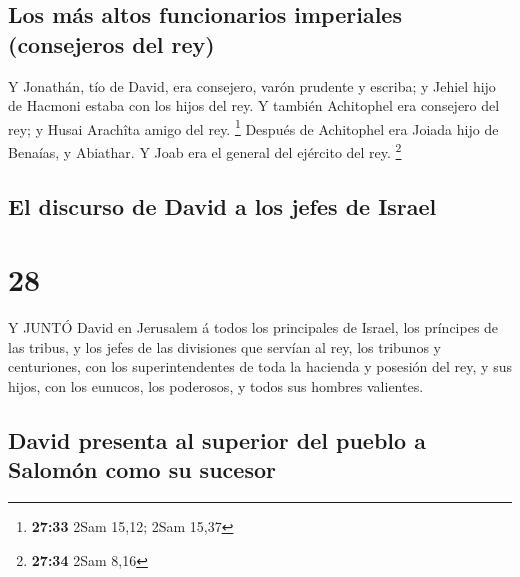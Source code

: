 \hypertarget{los-muxe1s-altos-funcionarios-imperiales-consejeros-del-rey}{%
\subsection{Los más altos funcionarios imperiales (consejeros del
rey)}\label{los-muxe1s-altos-funcionarios-imperiales-consejeros-del-rey}}

 Y Jonathán, tío de David, era consejero, varón prudente y
escriba; y Jehiel hijo de Hacmoni estaba con los hijos del rey.
 Y también Achitophel era consejero del rey; y Husai
Arachîta amigo del rey. \footnote{\textbf{27:33} 2Sam 15,12; 2Sam 15,37}
 Después de Achitophel era Joiada hijo de Benaías, y
Abiathar. Y Joab era el general del ejército del rey. \footnote{\textbf{27:34}
  2Sam 8,16}

\hypertarget{el-discurso-de-david-a-los-jefes-de-israel}{%
\subsection{El discurso de David a los jefes de
Israel}\label{el-discurso-de-david-a-los-jefes-de-israel}}

\hypertarget{section-27}{%
\section{28}\label{section-27}}

 Y JUNTÓ David en Jerusalem á todos los principales de
Israel, los príncipes de las tribus, y los jefes de las divisiones que
servían al rey, los tribunos y centuriones, con los superintendentes de
toda la hacienda y posesión del rey, y sus hijos, con los eunucos, los
poderosos, y todos sus hombres valientes.

\hypertarget{david-presenta-al-superior-del-pueblo-a-salomuxf3n-como-su-sucesor}{%
\subsection{David presenta al superior del pueblo a Salomón como su
sucesor}\label{david-presenta-al-superior-del-pueblo-a-salomuxf3n-como-su-sucesor}}

